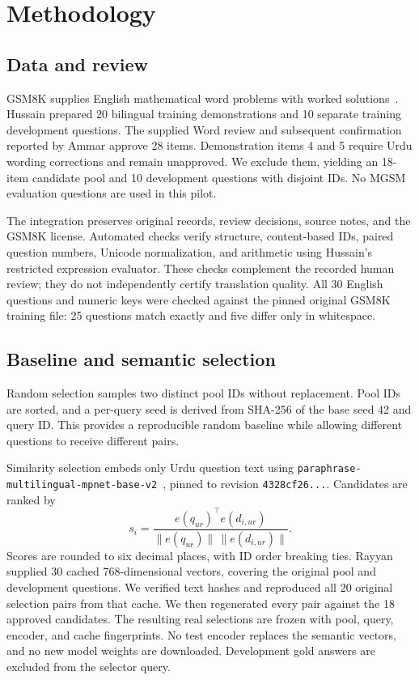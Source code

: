 \documentclass[conference]{IEEEtran}
\begin{document}
\section{Methodology}
\subsection{Data and review}
GSM8K supplies English mathematical word problems with worked solutions~\cite{cobbe}. Hussain prepared 20 bilingual training demonstrations and 10 separate training development questions. The supplied Word review and subsequent confirmation reported by Ammar approve 28 items. Demonstration items 4 and 5 require Urdu wording corrections and remain unapproved. We exclude them, yielding an 18-item candidate pool and 10 development questions with disjoint IDs. No MGSM evaluation questions are used in this pilot.

The integration preserves original records, review decisions, source notes, and the GSM8K license. Automated checks verify structure, content-based IDs, paired question numbers, Unicode normalization, and arithmetic using Hussain's restricted expression evaluator. These checks complement the recorded human review; they do not independently certify translation quality. All 30 English questions and numeric keys were checked against the pinned original GSM8K training file: 25 questions match exactly and five differ only in whitespace.

\subsection{Baseline and semantic selection}
Random selection samples two distinct pool IDs without replacement. Pool IDs are sorted, and a per-query seed is derived from SHA-256 of the base seed 42 and query ID. This provides a reproducible random baseline while allowing different questions to receive different pairs.

Similarity selection embeds only Urdu question text using \texttt{paraphrase-multilingual-}\allowbreak\texttt{mpnet-base-v2}~\cite{encoder}, pinned to revision \texttt{4328cf26...}. Candidates are ranked by
\begin{equation}
 s_i = \frac{e(q_{ur})^\top e(d_{i,ur})}{\|e(q_{ur})\|\,\|e(d_{i,ur})\|}.
\end{equation}
Scores are rounded to six decimal places, with ID order breaking ties. Rayyan supplied 30 cached 768-dimensional vectors, covering the original pool and development questions. We verified text hashes and reproduced all 20 original selection pairs from that cache. We then regenerated every pair against the 18 approved candidates. The resulting real selections are frozen with pool, query, encoder, and cache fingerprints. No test encoder replaces the semantic vectors, and no new model weights are downloaded. Development gold answers are excluded from the selector query.
\end{document}
